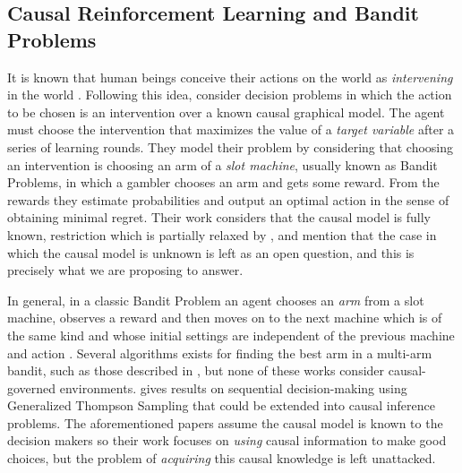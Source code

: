 \documentclass[review]{elsarticle}
\begin{document}
\subsection{Causal Reinforcement Learning and Bandit Problems}
It is known that human beings conceive their actions on the world as \textit{intervening} in the world \citep{hagmayer2009decision}. Following this idea, \cite{lattimoreNIPS2016} consider decision problems in which the action to be chosen is an intervention over a known causal graphical model. The agent must choose the intervention that maximizes the value of a \textit{target variable} after a series of learning rounds. They model their problem by considering that choosing an intervention is choosing an arm of a \textit{slot machine}, usually known as Bandit Problems, in which a gambler chooses an arm and gets some reward. From the rewards they estimate probabilities and output an optimal action in the sense of obtaining minimal regret. Their work considers that the causal model is fully known, restriction which is partially relaxed by \cite{sen2017identifying}, and mention that the case in which the causal model is unknown is left as an open question, and this is precisely what we are proposing to answer. 

In general, in a classic Bandit Problem an agent chooses an \textit{arm} from a slot machine, observes a reward and then moves on to the next machine which is of the same kind and whose initial settings are independent of the previous machine and action \citep{sutton1998reinforcement}. Several algorithms exists for finding the best arm in a multi-arm bandit, such as those described in \cite{bubeck2009pure,audibert2010best,gabillon2012best,agarwal2014taming,jamieson2014lil,jamieson2014best,chen2015optimal,carpentier2016tight,russo2016simple,kaufmann2016complexity}, but none of these works consider causal-governed environments. \cite{ortega2014generalized} gives results on sequential decision-making using Generalized Thompson Sampling that could be extended into causal inference problems. The aforementioned papers assume the causal model is known to the decision makers so their work focuses on \textit{using} causal information to make good choices, but the problem of \textit{acquiring} this causal knowledge is left unattacked.
\end{document}
